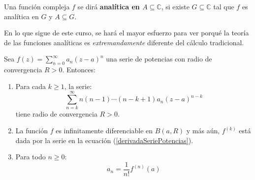 \documentclass[12pt]{report}
\newcounter{it}
\theoremstyle{largebreak}
\newcommand{\tbf}[1]{\textbf{#1}}
\begin{document}
    \begin{mydef}
        Una función compleja $f$ se dirá \tbf{analítica en $A\subseteq\mathbb{C}$}, si existe $G\subseteq\mathbb{C}$ tal que $f$ es analítica en $G$ y $A\subseteq G$.
    \end{mydef}

    En lo que sigue de este curso, se hará el mayor esfuerzo para ver porqué la teoría de las funciones analíticas es \textit{extremandamente} diferente del cálculo tradicional.

    \begin{propo}
        Sea $f(z)=\sum_{ n=0}^\infty a_n(z-a)^n$ una serie de potencias con radio de convergencia $R>0$. Entonces:
        \begin{enumerate}[label = \textit{(\arabic*)}]
            \item Para cada $k\geq 1$, la serie:
            \begin{equation}
                \label{derivadaSeriePotencias}
                \sum_{n=k}^\infty n(n-1)\cdots(n-k+1)a_n(z-a)^{ n-k}
            \end{equation}
            tiene radio de convergencia $R>0$.
            \item La función $f$ es infinitamente diferenciable en $B(a,R)$ y más aún, $f^{(k)}$ está dada por la serie en la ecuación (\ref{derivadaSeriePotencias}).
            \item Para todo $n\geq0$:
            \begin{equation*}
                a_n=\frac{1}{n!}f^{(n)}(a)
            \end{equation*}
        \end{enumerate}
    \end{propo}
\end{document}
